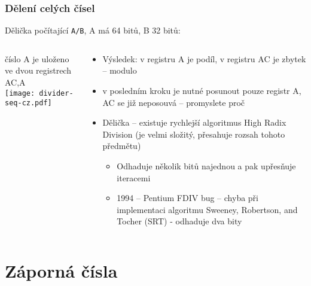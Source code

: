 \documentclass{beamer}
\begin{document}
\begin{frame}
\frametitle{Dělení celých čísel}

Dělička počítající \texttt{A/B}, A má 64 bitů, B 32 bitů:\\
\begin{columns}
\begin{column}{0.4\textwidth}
číslo A je uloženo ve dvou registrech AC,A\\
\texttt{[image: divider-seq-cz.pdf]}
\end{column}
\hfill
\begin{column}{0.6\textwidth}
\begin{itemize}
\item Výsledek: v registru A je podíl, v registru AC je zbytek -- modulo
\item v posledním kroku je nutné posunout pouze registr A, AC se již neposouvá -- promyslete proč
\item Dělička -- existuje rychlejší algoritmus High Radix Division (je velmi složitý, přesahuje rozsah tohoto předmětu)
\begin{itemize}
\item Odhaduje několik bitů najednou a pak upřesňuje iteracemi
\item 1994 -- Pentium FDIV bug -- chyba při implementaci algoritmu Sweeney, Robertson, and Tocher (SRT) - odhaduje dva bity
\end{itemize}
\end{itemize}
\end{column}
\end{columns}


\end{frame}


\section{Záporná čísla}
\end{document}
